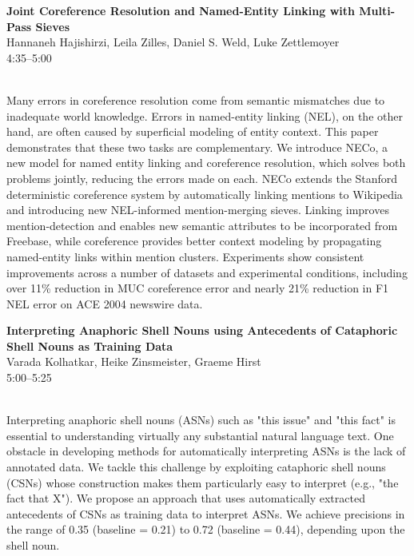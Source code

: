 \documentclass[twoside,makeidx]{book}
\begin{document}
\par\vspace{2em}\noindent%
\begin{minipage}{\linewidth}%
\begin{center}
\textbf{\normalsize Joint Coreference Resolution and Named-Entity Linking with Multi-Pass Sieves}\\
\normalsize  Hannaneh Hajishirzi,  Leila Zilles,  Daniel S. Weld,  Luke Zettlemoyer\\
{\small 4:35--5:00}\\
\end{center}
\end{minipage}\\[0.5em]
\nopagebreak%
\noindent%
{\small Many errors in coreference resolution come from semantic mismatches due to inadequate world knowledge. Errors in named-entity linking (NEL), on the other hand, are often caused by superficial modeling of entity context. This paper demonstrates that these two tasks are complementary. We introduce NECo, a new model for named entity linking and coreference resolution, which solves both problems jointly, reducing the errors made on each. NECo extends the Stanford deterministic coreference system by automatically linking mentions to Wikipedia and introducing new NEL-informed mention-merging sieves. Linking improves mention-detection and enables new semantic attributes to be incorporated from Freebase, while coreference provides better context modeling by propagating named-entity links within mention clusters. Experiments show consistent improvements across a number of datasets and experimental conditions, including over 11\% reduction in MUC coreference error and nearly 21\% reduction in F1 NEL error on ACE 2004 newswire data.}
\par\vspace{2em}\noindent%
\begin{minipage}{\linewidth}%
\begin{center}
\textbf{\normalsize Interpreting Anaphoric Shell Nouns using Antecedents of Cataphoric Shell Nouns as Training Data}\\
\normalsize  Varada Kolhatkar,  Heike Zinsmeister,  Graeme Hirst\\
{\small 5:00--5:25}\\
\end{center}
\end{minipage}\\[0.5em]
\nopagebreak%
\noindent%
{\small Interpreting anaphoric shell nouns (ASNs) such as "this issue" and "this fact" is essential to understanding virtually any substantial natural language text. One obstacle in developing methods for automatically interpreting ASNs is the lack of annotated data. We tackle this challenge by exploiting cataphoric shell nouns (CSNs) whose construction makes them particularly easy to interpret (e.g., "the fact that X"). We propose an approach that uses automatically extracted antecedents of CSNs as training data to interpret ASNs. We achieve precisions in the range of 0.35 (baseline = 0.21) to 0.72 (baseline = 0.44), depending upon the shell noun.}
\clearpage
\end{document}
